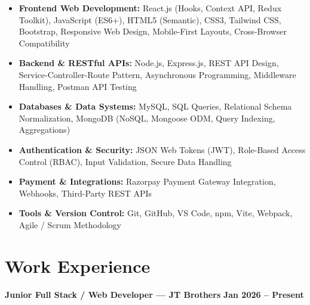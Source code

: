 \documentclass[a4paper,10pt]{article}
\begin{document}
\begin{itemize}

    \item \textbf{Frontend Web Development:}
    React.js (Hooks, Context API, Redux Toolkit), JavaScript (ES6+),
    HTML5 (Semantic), CSS3, Tailwind CSS, Bootstrap, Responsive Web Design,
    Mobile-First Layouts, Cross-Browser Compatibility

    \item \textbf{Backend \& RESTful APIs:}
    Node.js, Express.js, REST API Design, Service-Controller-Route Pattern,
    Asynchronous Programming, Middleware Handling, Postman API Testing

    \item \textbf{Databases \& Data Systems:}
    MySQL, SQL Queries, Relational Schema Normalization,
    MongoDB (NoSQL, Mongoose ODM, Query Indexing, Aggregations)

    \item \textbf{Authentication \& Security:}
    JSON Web Tokens (JWT), Role-Based Access Control (RBAC),
    Input Validation, Secure Data Handling

    \item \textbf{Payment \& Integrations:}
    Razorpay Payment Gateway Integration, Webhooks, Third-Party REST APIs

    \item \textbf{Tools \& Version Control:}
    Git, GitHub, VS Code, npm, Vite, Webpack, Agile / Scrum Methodology

\end{itemize}

\section*{Work Experience}

\textbf{Junior Full Stack / Web Developer --- JT Brothers}
\hfill
\textbf{Jan 2026 -- Present}
\end{document}
